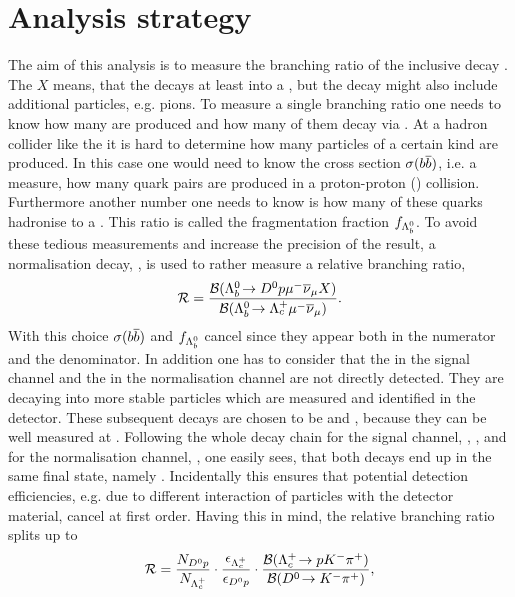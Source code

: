 \chapter{Analysis strategy}
\label{sec:Strategy}
The aim of this analysis is to measure the branching ratio of the inclusive decay \LbToDpmunuX.
The $X$ means, that the \Lb decays at least into a \Dz\proton\mun\neumb, but the decay might also include additional particles, e.g. pions.
To measure a single branching ratio one needs to know how many \Lb are produced and how many of them decay via \LbToDpmunu.
At a hadron collider like the \lhc it is hard to determine how many particles of a certain kind are produced.
In this case one would need to know the \bquark\bquarkbar cross section $\sigma({b}{\overline {{b}}})$, i.e. a measure, how many \bquark\bquarkbar quark pairs are produced in a proton-proton (\proton\proton) collision.
Furthermore another number one needs to know is how many of these \bquark quarks hadronise to a \Lb.
This ratio is called the fragmentation fraction $f_{{{\Lambda}^0_{b}}}$.
To avoid these tedious measurements and increase the precision of the result, a normalisation decay, \LbToLcmunu, is used to rather measure a relative branching ratio,
\begin{align}
	\mathcal{R} =
	\frac{{\cal B}({{\Lambda}^0_{b}}\!\rightarrow {\ensuremath{{D}^0}}{\ensuremath{p}} {\ensuremath{\mu^-}} {\ensuremath{{\overline{\nu}}_\mu}} X)}{{\cal B}({{\Lambda}^0_{b}}\!\rightarrow {\ensuremath{{\Lambda}^+_{c}}} {\ensuremath{\mu^-}}{\ensuremath{{\overline{\nu}}_\mu}})}. \label{eq:R_def}
\end{align}
With this choice $\sigma({b}{\overline {{b}}})$ and $f_{{{\Lambda}^0_{b}}}$ cancel since they appear both in the numerator and the denominator.
In addition one has to consider that the \Dz in the signal channel and the \Lc in the normalisation channel are not directly detected.
They are decaying into more stable particles which are measured and identified in the detector.
These subsequent decays are chosen to be \DToKpi and \LcTopKpi, because they can be well measured at \lhcb.
Following the whole decay chain for the signal channel, \LbToDpmunuX, \DToKpi, and for the normalisation channel, \LbToLcmunu, \LcTopKpi one easily sees, that both decays end up in the same final state, namely \pKpi\mun\neumb.
Incidentally this ensures that potential detection efficiencies, e.g. due to different interaction of particles with the detector material, cancel at first order.
Having this in mind, the relative branching ratio splits up to
\begin{align}
	\mathcal{R} =
	 \frac{N_{{{D}^0}{p}}}{N_{{{\Lambda}^+_{c}}}}  
	 \cdot \frac{\epsilon_{{{\Lambda}^+_{c}}}}{\epsilon_{{{D}^0}{p}}}
	 \cdot \frac{{\cal B}({{\Lambda}^+_{c}}\!\rightarrow p {{K}^-} {{\pi}^+})}{{\cal B}({{D}^0}\!\rightarrow {\ensuremath{{K}^-}}{\ensuremath{{\pi}^+}})}, \label{eq:R}
\end{align}
